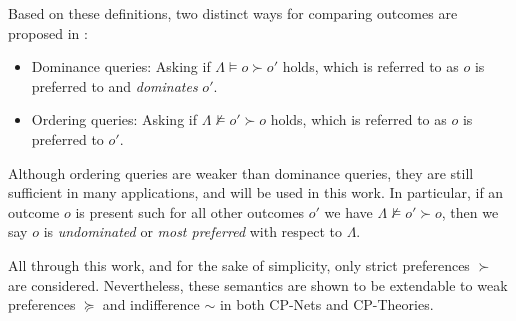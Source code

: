 Based on these definitions, two distinct ways for comparing outcomes are proposed in \cite{Boutilier2004}:
\begin{itemize}
    \item Dominance queries: Asking if $\Lambda \models o \succ o'$ holds, which is referred to as $o$ is preferred to and \textit{dominates} $o'$.
    \item Ordering queries: Asking if $\Lambda \not\models o' \succ o$ holds, which is referred to as $o$ is preferred to $o'$.
\end{itemize}
Although ordering queries are weaker than dominance queries, they are still sufficient in many applications, and will be used in this work. In particular, if an outcome $o$ is present such for all other outcomes $o'$ we have $\Lambda \not\models o' \succ o$, then we say $o$ is \textit{undominated} or \textit{most preferred} with respect to $\Lambda$.

All through this work, and for the sake of simplicity, only strict preferences $\succ$ are considered. Nevertheless, these semantics are shown to be extendable to weak preferences $\succeq$ and indifference $\sim$ in both CP-Nets and CP-Theories.



